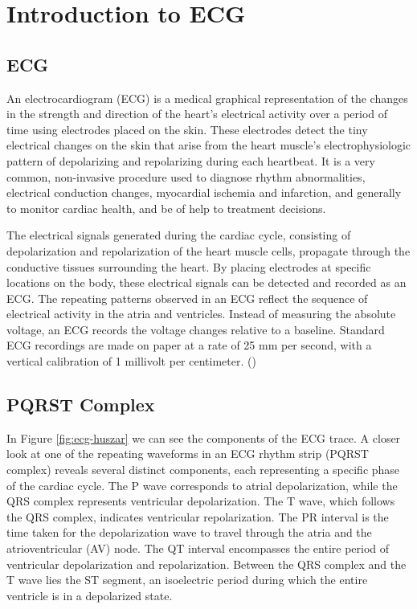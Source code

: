 \documentclass{mldsmsc}
\begin{document}
\section{Introduction to ECG}

\subsection{ECG}

An electrocardiogram (ECG) is a medical graphical representation of the changes in the strength and direction of the heart's electrical activity over a period of time using electrodes placed on the skin. These electrodes detect the tiny electrical changes on the skin that arise from the heart muscle's electrophysiologic pattern of depolarizing and repolarizing during each heartbeat. It is a very common, non-invasive procedure used to diagnose rhythm abnormalities, electrical conduction changes, myocardial ischemia and infarction, and generally to monitor cardiac health, and be of help to treatment decisions. \newline

\noindent The electrical signals generated during the cardiac cycle, consisting of depolarization and repolarization of the heart muscle cells, propagate through the conductive tissues surrounding the heart. By placing electrodes at specific locations on the body, these electrical signals can be detected and recorded as an ECG. The repeating patterns observed in an ECG reflect the sequence of electrical activity in the atria and ventricles. Instead of measuring the absolute voltage, an ECG records the voltage changes relative to a baseline. Standard ECG recordings are made on paper at a rate of 25 mm per second, with a vertical calibration of 1 millivolt per centimeter. (\cite{alma991000225790601591}) \newline

\subsection{PQRST Complex}

\noindent In Figure \ref{fig:ecg-huszar} we can see the components of the ECG trace. A closer look at one of the repeating waveforms in an ECG rhythm strip (PQRST complex) reveals several distinct components, each representing a specific phase of the cardiac cycle. The P wave corresponds to atrial depolarization, while the QRS complex represents ventricular depolarization. The T wave, which follows the QRS complex, indicates ventricular repolarization. The PR interval is the time taken for the depolarization wave to travel through the atria and the atrioventricular (AV) node. The QT interval encompasses the entire period of ventricular depolarization and repolarization. Between the QRS complex and the T wave lies the ST segment, an isoelectric period during which the entire ventricle is in a depolarized state.
\end{document}
